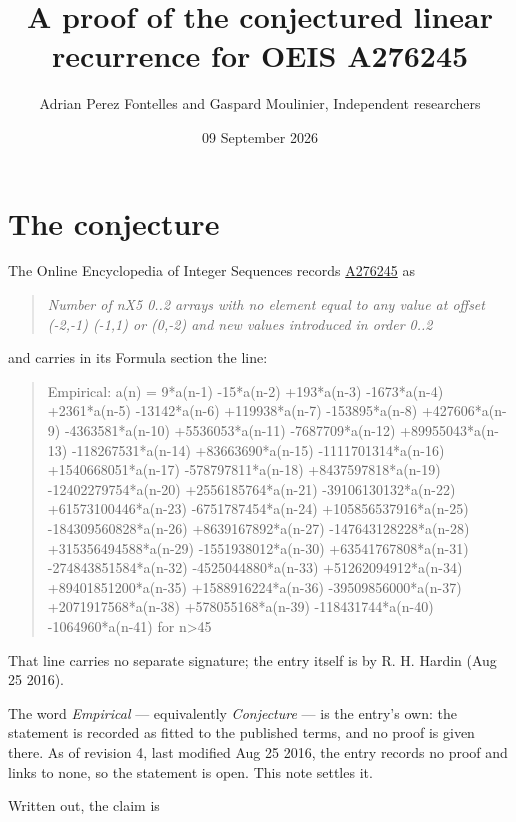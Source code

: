 \documentclass[11pt]{article}
\title{A proof of the conjectured linear recurrence for OEIS A276245}
\author{Adrian Perez Fontelles and Gaspard Moulinier, Independent researchers}
\date{09 September 2026}
\theoremstyle{definition}
\begin{document}
\maketitle
\section{The conjecture}

The Online Encyclopedia of Integer Sequences records \href{https://oeis.org/A276245}{A276245} as

\begin{quote}\itshape Number of nX5 0..2 arrays with no element equal to any value at offset (-2,-1) (-1,1) or (0,-2) and new values introduced in order 0..2\end{quote}

and carries in its Formula section the line:

\begin{quote}\ttfamily Empirical: a(n) = 9*a(n-1) -15*a(n-2) +193*a(n-3) -1673*a(n-4) +2361*a(n-5) -13142*a(n-6) +119938*a(n-7) -153895*a(n-8) +427606*a(n-9) -4363581*a(n-10) +5536053*a(n-11) -7687709*a(n-12) +89955043*a(n-13) -118267531*a(n-14) +83663690*a(n-15) -1111701314*a(n-16) +1540668051*a(n-17) -578797811*a(n-18) +8437597818*a(n-19) -12402279754*a(n-20) +2556185764*a(n-21) -39106130132*a(n-22) +61573100446*a(n-23) -6751787454*a(n-24) +105856537916*a(n-25) -184309560828*a(n-26) +8639167892*a(n-27) -147643128228*a(n-28) +315356494588*a(n-29) -1551938012*a(n-30) +63541767808*a(n-31) -274843851584*a(n-32) -4525044880*a(n-33) +51262094912*a(n-34) +89401851200*a(n-35) +1588916224*a(n-36) -39509856000*a(n-37) +2071917568*a(n-38) +578055168*a(n-39) -118431744*a(n-40) -1064960*a(n-41) for n>45\end{quote}

That line carries no separate signature; the entry itself is by R. H. Hardin (Aug 25 2016).

The word {\itshape Empirical} --- equivalently {\itshape Conjecture} --- is the entry's own: the statement is recorded as fitted to the published terms, and no proof is given there. As of revision 4, last modified Aug 25 2016, the entry records no proof and links to none, so the statement is open. This note settles it.

Written out, the claim is
\end{document}
